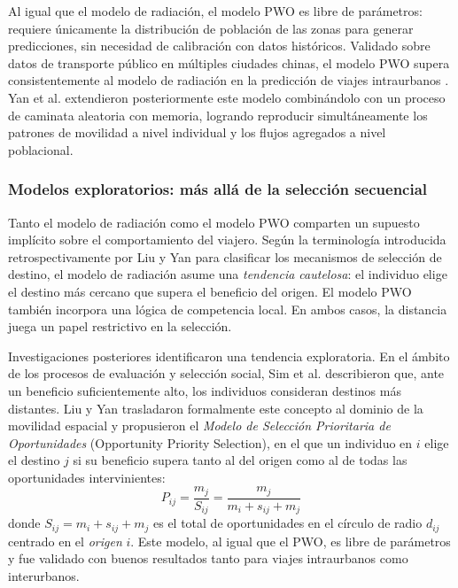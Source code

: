 Al igual que el modelo de radiación, el modelo PWO es libre de parámetros: requiere únicamente la distribución de población de las zonas para generar predicciones, sin necesidad de calibración con datos históricos. Validado sobre datos de transporte público en múltiples ciudades chinas, el modelo PWO supera consistentemente al modelo de radiación en la predicción de viajes intraurbanos \cite{yan2014population}. Yan et al. \cite{yan2017unified} extendieron posteriormente este modelo combinándolo con un proceso de caminata aleatoria con memoria, logrando reproducir simultáneamente los patrones de movilidad a nivel individual y los flujos agregados a nivel poblacional.

\subsubsection{Modelos exploratorios: más allá de la selección secuencial}

Tanto el modelo de radiación como el modelo PWO comparten un supuesto implícito sobre el comportamiento del viajero. Según la terminología introducida retrospectivamente por Liu y Yan \cite{liu2020intervening} para clasificar los mecanismos de selección de destino, el modelo de radiación asume una \textit{tendencia cautelosa}: el individuo elige el destino más cercano que supera el beneficio del origen. El modelo PWO también incorpora una lógica de competencia local. En ambos casos, la distancia juega un papel restrictivo en la selección.

Investigaciones posteriores identificaron una tendencia exploratoria. En el ámbito de los procesos de evaluación y selección social, Sim et al. \cite{sim2015deliberate} describieron que, ante un beneficio suficientemente alto, los individuos consideran destinos más distantes. Liu y Yan \cite{liu2019opportunity} trasladaron formalmente este concepto al dominio de la movilidad espacial y propusieron el \textit{Modelo de Selección Prioritaria de Oportunidades} (Opportunity Priority Selection), en el que un individuo en $i$ elige el destino $j$ si su beneficio supera tanto al del origen como al de todas las oportunidades intervinientes:
\begin{equation}
    P_{ij} = \frac{m_j}{S_{ij}} = \frac{m_j}{m_i + s_{ij} + m_j}
    \label{eq:ops}
\end{equation}
donde $S_{ij} = m_i + s_{ij} + m_j$ es el total de oportunidades en el círculo de radio $d_{ij}$ centrado en el \emph{origen} $i$. Este modelo, al igual que el PWO, es libre de parámetros y fue validado con buenos resultados tanto para viajes intraurbanos como interurbanos.

